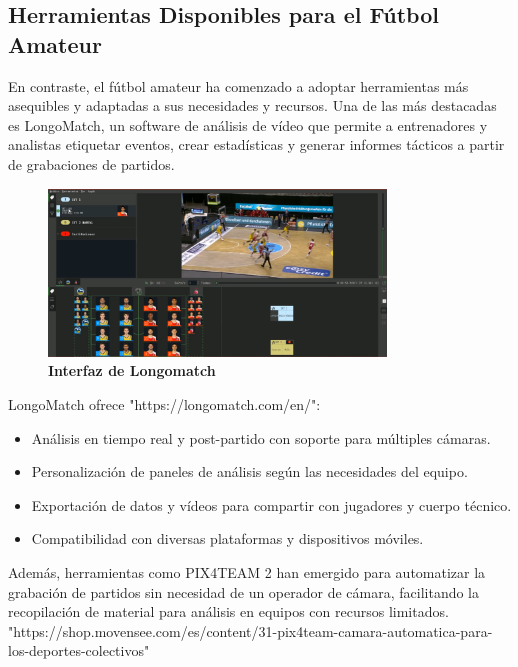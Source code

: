 \documentclass[12pt, a4paper, twoside]{article}
\begin{document}
	
	\subsection{Herramientas Disponibles para el Fútbol Amateur}
	
	En contraste, el fútbol amateur ha comenzado a adoptar herramientas más asequibles y adaptadas a sus necesidades y recursos. Una de las más destacadas es LongoMatch, un software de análisis de vídeo que permite a entrenadores y analistas etiquetar eventos, crear estadísticas y generar informes tácticos a partir de grabaciones de partidos.
	
	\begin{figure}[h]
		\centering
		\includegraphics[width=0.8\textwidth]{image/longomatch}
		\caption{\textbf{Interfaz de Longomatch}}
		\label{fig:longomatch}
	\end{figure} 
	
	LongoMatch ofrece "https://longomatch.com/en/":
	\begin{itemize}
		\item	Análisis en tiempo real y post-partido con soporte para múltiples cámaras.

	
		\item Personalización de paneles de análisis según las necesidades del equipo.
	
		\item Exportación de datos y vídeos para compartir con jugadores y cuerpo técnico.
	
		\item Compatibilidad con diversas plataformas y dispositivos móviles.
	\end{itemize}
	
	Además, herramientas como PIX4TEAM 2 han emergido para automatizar la grabación de partidos sin necesidad de un operador de cámara, facilitando la recopilación de material para análisis en equipos con recursos limitados. "https://shop.movensee.com/es/content/31-pix4team-camara-automatica-para-los-deportes-colectivos"
	
\end{document}

